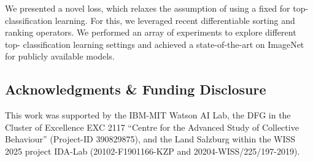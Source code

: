 \documentclass{article}
\begin{document}
\begin{table}[t]
We presented a novel loss, which relaxes the assumption of using a fixed  for top- classification learning.
For this, we leveraged recent differentiable sorting and ranking operators.
We performed an array of experiments to explore different top- classification learning settings and achieved a state-of-the-art on ImageNet for publicly available models.

\subsection*{Acknowledgments \& Funding Disclosure}

This work was supported by 
the IBM-MIT Watson AI Lab, 
the DFG in the Cluster of Excellence EXC 2117 ``Centre for the Advanced Study of Collective Behaviour'' (Project-ID 390829875),
and the Land Salzburg within the WISS 2025 project IDA-Lab (20102-F1901166-KZP and 20204-WISS/225/197-2019).























  





















  






















































\end{table}
\end{document}
